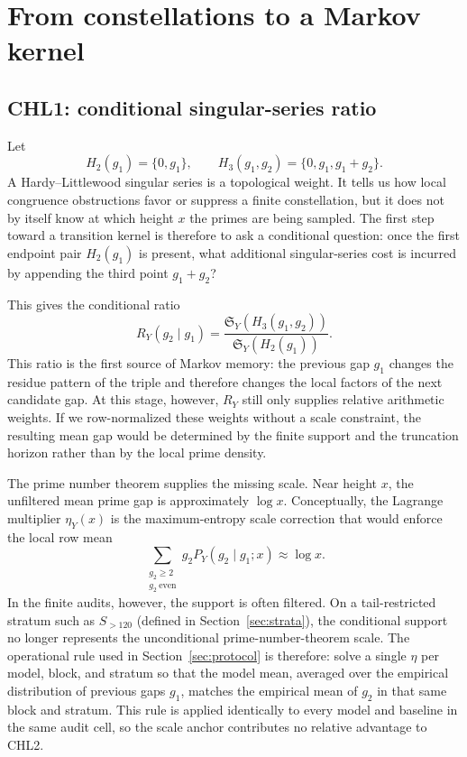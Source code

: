 \documentclass[10pt]{article}
\newcommand{\SY}{\mathfrak{S}_Y}
\begin{document}
\section{From constellations to a Markov kernel}\label{sec:chl-kernels}
\subsection{CHL1: conditional singular-series ratio}
Let
\[
H_2(g_1)=\{0,g_1\},\qquad H_3(g_1,g_2)=\{0,g_1,g_1+g_2\}.
\]
A Hardy--Littlewood singular series is a topological weight.  It tells us how local congruence obstructions favor or suppress a finite constellation, but it does not by itself know at which height $x$ the primes are being sampled.  The first step toward a transition kernel is therefore to ask a conditional question: once the first endpoint pair $H_2(g_1)$ is present, what additional singular-series cost is incurred by appending the third point $g_1+g_2$?

This gives the conditional ratio
\[
R_Y(g_2\mid g_1)=\frac{\SY(H_3(g_1,g_2))}{\SY(H_2(g_1))}.
\]
This ratio is the first source of Markov memory: the previous gap $g_1$ changes the residue pattern of the triple and therefore changes the local factors of the next candidate gap.  At this stage, however, $R_Y$ still only supplies relative arithmetic weights.  If we row-normalized these weights without a scale constraint, the resulting mean gap would be determined by the finite support and the truncation horizon rather than by the local prime density.

The prime number theorem supplies the missing scale.  Near height $x$, the unfiltered mean prime gap is approximately $\log x$.  Conceptually, the Lagrange multiplier $\eta_Y(x)$ is the maximum-entropy scale correction that would enforce the local row mean
\[
\sum_{\substack{g_2\ge2\\g_2\ \mathrm{even}}}g_2 P_Y(g_2\mid g_1;x)\approx \log x.
\]
In the finite audits, however, the support is often filtered.  On a tail-restricted stratum such as $S_{>120}$ (defined in Section~\ref{sec:strata}), the conditional support no longer represents the unconditional prime-number-theorem scale.  The operational rule used in Section~\ref{sec:protocol} is therefore: solve a single $\eta$ per model, block, and stratum so that the model mean, averaged over the empirical distribution of previous gaps $g_1$, matches the empirical mean of $g_2$ in that same block and stratum.  This rule is applied identically to every model and baseline in the same audit cell, so the scale anchor contributes no relative advantage to CHL2.
\end{document}
